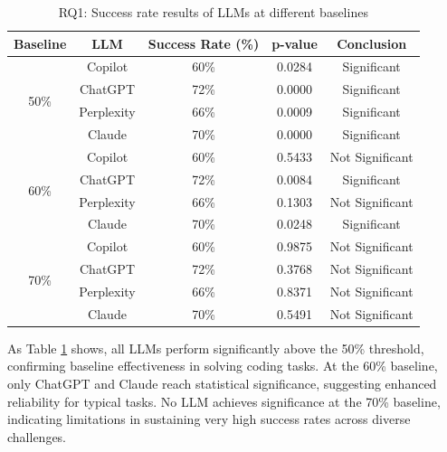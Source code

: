 \documentclass[conference]{IEEEtran}
\begin{document}
\begin{table}[H]
\centering
\caption{RQ1: Success rate results of LLMs at different baselines}
\label{tab:llm_success_rate}
\scriptsize 
\begin{tabular}{|c|c|c|c|c|}
\hline
\textbf{Baseline} & \textbf{LLM} & \textbf{Success Rate (\%)} & \textbf{p-value} & \textbf{Conclusion} \\ \hline
\multirow{4}{*}{50\%} 
    & Copilot     & 60\% & 0.0284 & Significant       \\ \cline{2-5} 
    & ChatGPT     & 72\% & 0.0000 & Significant       \\ \cline{2-5} 
    & Perplexity  & 66\% & 0.0009 & Significant       \\ \cline{2-5} 
    & Claude      & 70\% & 0.0000 & Significant       \\ \hline

\multirow{4}{*}{60\%} 
    & Copilot     & 60\% & 0.5433 & Not Significant   \\ \cline{2-5} 
    & ChatGPT     & 72\% & 0.0084 & Significant       \\ \cline{2-5} 
    & Perplexity  & 66\% & 0.1303 & Not Significant   \\ \cline{2-5} 
    & Claude      & 70\% & 0.0248 & Significant       \\ \hline

\multirow{4}{*}{70\%} 
    & Copilot     & 60\% & 0.9875 & Not Significant   \\ \cline{2-5} 
    & ChatGPT     & 72\% & 0.3768 & Not Significant   \\ \cline{2-5} 
    & Perplexity  & 66\% & 0.8371 & Not Significant   \\ \cline{2-5} 
    & Claude      & 70\% & 0.5491 & Not Significant   \\ \hline
\end{tabular}
\end{table}


As Table \ref{tab:llm_success_rate} shows, all LLMs perform significantly above the 50\% threshold, confirming baseline effectiveness in solving coding tasks. At the 60\% baseline, only ChatGPT and Claude reach statistical significance, suggesting enhanced reliability for typical tasks. No LLM achieves significance at the 70\% baseline, indicating limitations in sustaining very high success rates across diverse challenges.
\end{document}
